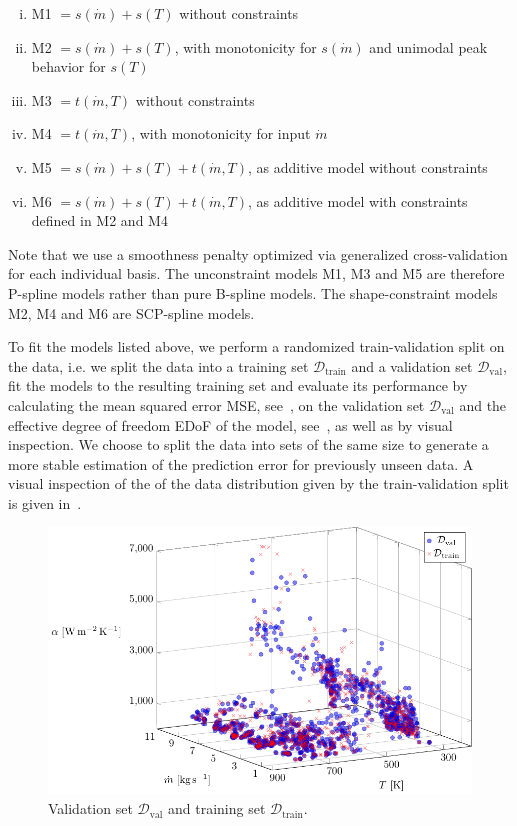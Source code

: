 \begin{enumerate}[(i)]
	\item M1 $= s(\dot{m}) + s(T)$ without constraints
	\item M2 $= s(\dot{m}) + s(T)$, with monotonicity for $s(\dot{m})$ and unimodal peak behavior for $s(T)$
	\item M3 $= t(\dot{m}, T)$ without constraints
	\item M4 $= t(\dot{m}, T)$, with monotonicity for input $\dot{m}$
	\item M5 $= s(\dot{m}) + s(T) + t(\dot{m}, T)$, as additive model without constraints
	\item M6 $= s(\dot{m}) + s(T) + t(\dot{m}, T)$, as additive model with constraints defined in M2 and M4
\end{enumerate}
%
Note that we use a smoothness penalty optimized via generalized cross-validation for each individual basis. The unconstraint models M1, M3 and M5 are therefore P-spline models rather than pure B-spline models. The shape-constraint models M2, M4 and M6 are SCP-spline models. 


To fit the models listed above, we perform a randomized train-validation split on the data, i.e. we split the data into a training set $\mathcal{D}_{\text{train}}$ and a validation set $\mathcal{D}_{\text{val}}$, fit the models to the resulting training set and evaluate its performance by calculating the mean squared error MSE, see~, on the validation set $\mathcal{D}_{\text{val}}$ and the effective degree of freedom EDoF of the model, see~, as well as by visual inspection. We choose to split the data into sets of the same size to generate a more stable estimation of the prediction error for previously unseen data. A visual inspection of the of the data distribution given by the train-validation split is given in~.

\begin{figure}[H]
	\centering
	\includegraphics[width=\columnwidth]{graphics/pgfplots/cha5/Ebner/train-val-split.pdf}
	\caption{Validation set $\mathcal{D}_{\text{val}}$ and training set $\mathcal{D}_{\text{train}}$.}
	\label{fig:ebner-train-val-split}
\end{figure}
%

